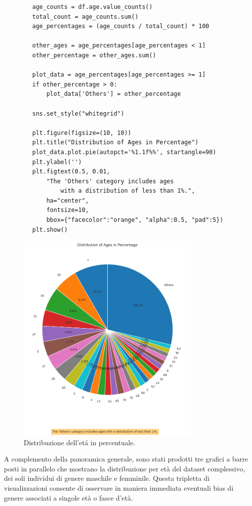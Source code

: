 \documentclass[a4paper,12pt]{report}
\begin{document}
	\begin{verbatim}
		age_counts = df.age.value_counts()
		total_count = age_counts.sum()
		age_percentages = (age_counts / total_count) * 100
		
		other_ages = age_percentages[age_percentages < 1]
		other_percentage = other_ages.sum()
		
		plot_data = age_percentages[age_percentages >= 1]
		if other_percentage > 0:
			plot_data['Others'] = other_percentage
		
		sns.set_style("whitegrid")
		
		plt.figure(figsize=(10, 10))
		plt.title("Distribution of Ages in Percentage")
		plot_data.plot.pie(autopct='%1.1f%%', startangle=90)
		plt.ylabel('')
		plt.figtext(0.5, 0.01, 
			"The 'Others' category includes ages 
				with a distribution of less than 1%.", 
			ha="center", 
			fontsize=10, 
			bbox={"facecolor":"orange", "alpha":0.5, "pad":5})
		plt.show()
	\end{verbatim}
	
	\begin{figure}[H]
		\centering
		\includegraphics[width=0.8\textwidth]{img/ages_image.png}
		\caption{Distribuzione dell'etá in percentuale.}
	\end{figure}
	
	A complemento della panoramica generale, sono stati prodotti tre grafici a barre posti in parallelo che mostrano la distribuzione per età del dataset complessivo, dei soli individui di genere maschile e femminile. Questa tripletta di visualizzazioni consente di osservare in maniera immediata eventuali bias di genere associati a singole età o fasce d'età. \\
	
\end{document}
